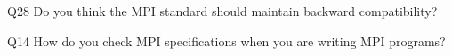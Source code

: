 \begin{description}%
\item{Q28} Do you think the MPI standard should maintain backward compatibility?%
\item{Q14} How do you check MPI specifications when you are writing MPI programs?%
\end{description}%
